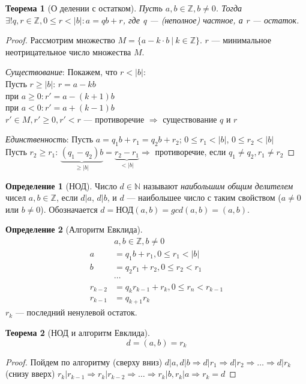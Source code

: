 \documentclass{article}
\theoremstyle{definition}
\newtheorem{definition}{Определение}
\theoremstyle{plain}
\newtheorem{theorem}{Теорема}
\begin{document}
\begin{theorem}[О делении с остатком]
  Пусть $a, b \in \mathbb{Z}, b \neq 0$.
  Тогда $\exists! q, r \in \mathbb{Z}, 0 \leq r < |b|: a = qb+r$, где q --- (неполное) частное, а r --- остаток.
\end{theorem}
\begin{proof}
  Рассмотрим множество $M = \{a - k \cdot b\ |\ k \in \mathbb{Z}\}$.
  $r$ --- минимальное неотрицательное число множества $M$.

  \emph{Существование}:
  Покажем, что $r < |b|$:\\
  Пусть $r \geq |b|$: $r = a - kb$\\
  при $a \geq 0: r' = a - (k + 1)b$ \\
  при $a < 0: r' = a + (k - 1)b$\\
  $r' \in M, r' \geq 0, r' < r$ --- противоречие $\Rightarrow$ существование $q$ и $r$

  \emph{Единственность}:
  Пусть $a = q_{1}b + r_{1} = q_{2}b + r_{2}$;
  $0 \leq r_{1} < |b|$, $0 \leq r_{2} < |b|$\\
  Пусть $r_{2} \geq r_{1}$: $\underbrace{(q_{1} - q_{2})b}_{\geq |b|} = \underbrace{r_{2} - r_{1}}_{< |b|} \Rightarrow$ противоречие, если $q_{1} \neq q_{2}, r_{1} \neq r_{2}$
\end{proof}

\begin{definition}[НОД]
Число $d \in \mathbb{N}$ называют \emph{наибольшим общим делителем} чисел $a, b \in \mathbb{Z}$, если $d|a$, $d|b$, и $d$ --- наибольшее число с таким свойством ($a \neq 0$ или $b \neq 0$).
Обозначается $d = \text{НОД}(a, b) = gcd(a, b) = (a, b)$.
\end{definition}

\begin{definition}[Алгоритм Евклида]
  \begin{align*}
    &a, b \in \mathbb{Z}, b \neq 0\\
    a &= q_{1}b+r_{1}, 0 \leq r_{1} < |b|\\
    b &= q_{2}r_{1}+r_{2}, 0 \leq r_{2} < r_{1}\\
    &\cdots\\
    r_{k-2} &= q_{k}r_{k-1}+r_{k}, 0 \leq r_{n} < r_{k-1}\\
    r_{k-1} &= q_{k+1} r_{k}
  \end{align*}
  $r_{k}$ --- последний ненулевой остаток.
\end{definition}

\begin{theorem}[НОД и алгоритм Евклида]
  \begin{equation*}
    d = (a, b) = r_{k}
  \end{equation*}
\end{theorem}
\begin{proof}
  Пойдем по алгоритму (сверху вниз)
  $d | a, d | b \Rightarrow d | r_{1} \Rightarrow d | r_{2} \Rightarrow \ldots \Rightarrow d | r_{k}$\\
  (снизу вверх) $r_{k}|r_{k-1} \Rightarrow r_{k}|r_{k-2} \Rightarrow \ldots \Rightarrow r_{k}|b, r_{k}|a \Rightarrow r_{k} = d$
\end{proof}
\end{document}
